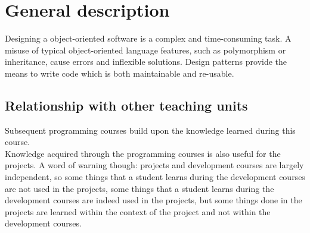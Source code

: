 \section{General description}
		Designing a object-oriented software is a complex and time-consuming task. A misuse of typical object-oriented language features, such as polymorphism or inheritance, cause errors and inflexible solutions. Design patterns provide the means to write code which is both maintainable and re-usable. \\
		

	\subsection{Relationship with other teaching units}
		Subsequent programming courses build upon the knowledge learned during this course.	\\		
		Knowledge acquired through the programming courses is also useful for the projects. A word of warning though: projects and development courses are largely independent, so some things that a student learns during the development courses are not used in the projects, some things that a student learns during the development courses are indeed used in the projects, but some things done in the projects are learned within the context of the project and not within the development courses.

